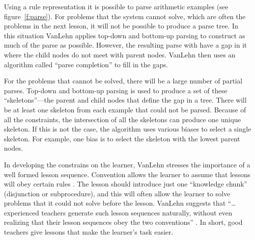 Using a rule representation it is possible to parse arithmetic examples
(see figure~\ref{f:parse}).  For problems that the system cannot solve,
which are often the problems in the next lesson, it will not be possible to
produce a parse
tree.  In this situation VanLehn applies top-down and bottom-up parsing to
construct as much of the parse as possible.  However, the resulting parse
with have a gap in it where the child nodes do not meet with parent nodes.
VanLehn then uses an algorithm called ``parse completion'' to fill in the
gaps.


For the problems that cannot be solved, there will be a large number of
partial parses. Top-down and bottom-up parsing is used to produce a set of
these ``skeletons''---the parent and child nodes that define the gap in a
tree.  There will be at least one skeleton from each example that could
not be parsed.  Because of all the constraints,
the intersection of all the
skeletons can produce one unique skeleton.  If this is not the case, the
algorithm uses various biases to select a single skeleton. For example, one
bias is to select the skeleton with the lowest parent nodes.


In developing the constrains on the learner, VanLehn stresses the
importance of a well formed lesson sequence.  Convention allows the learner
to assume that lessons will obey certain rules \cite{vanllear}.  The lesson
should introduce just one ``knowledge chunk'' (disjunction or
subprocedure), and this will often allow the learner to solve problems that
it could not solve before the lesson.  VanLehn suggests that ``\ldots
experienced teachers generate such lesson sequences naturally, without even
realizing that their lesson sequences obey the two conventions''
\citeyear[p.~7]{vanllear}.  In short, good teachers give lessons that make
the learner's task easier.

